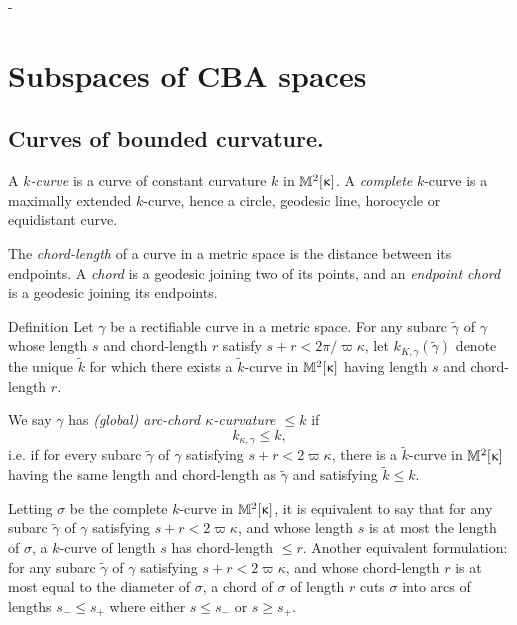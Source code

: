-%



\chapter{Subspaces of CBA spaces}

\section{Curves of bounded curvature.}\label{sec:cbc}

A {\it $k$-curve}  is a curve of constant
curvature $k$ in $\mathbb{M}_{{}}^{2}[{\upkappa}]$.  A {\it complete} $k$-curve is a maximally extended $k$-curve, hence a circle, geodesic
line, horocycle or equidistant curve.  

The \emph{chord-length} of a curve in a metric space is the distance between its endpoints.  A \emph{chord} is a geodesic joining two of its points, and an \emph{endpoint chord} is a geodesic joining its endpoints.

\begin{thm}{Definition}
\label{def:arc-chord}
Let $\gamma$ be a rectifiable curve in a metric space. For any subarc $\tilde\gamma$ of $\gamma$ whose length $s$ and chord-length $r$ satisfy $s+r <
2\pi/\varpi\kappa$, let $k_{K,\gamma}( \tilde \gamma)$ denote the unique $\tilde k$
for which there exists a $ \tilde k$-curve in $\mathbb{M}_{{}}^{2}[{\upkappa}]$ having length $s$ and
chord-length $r$. 
 
 We say $\gamma$ has \emph{(global) arc-chord $\kappa$-curvature $\le k$} if 
 $$k_{\kappa,\gamma} \le k,$$
i.e. if for every
subarc $\tilde\gamma$ of $\gamma$ satisfying $s+r < 2\varpi\kappa$, there is a
$ \tilde k$-curve in $\mathbb{M}_{{}}^{2}[{\upkappa}]$  having the same length and chord-length as $ \tilde \gamma$ and satisfying $ \tilde k \le
k$. 
\end{thm}

Letting  $\sigma$ be the complete $k$-curve in  $\mathbb{M}_{{}}^{2}[{\upkappa}]$, it is equivalent to say that for any subarc $ \tilde \gamma$ of $\gamma$  satisfying $s+r < 2\varpi\kappa$,  and whose length $s$ is at most the length of  $\sigma$, a $k$-curve of length $s$ has chord-length $\le r$.  Another equivalent formulation:  for any subarc $ \tilde \gamma$ of $\gamma$ satisfying $s+r < 2\varpi\kappa$,  and whose chord-length $r$ is  at most equal to the diameter of $\sigma$, a chord of  $\sigma$ of length $r$ cuts $\sigma$ into arcs of lengths $s_-\le s_+$ where either $s\le s_-$ or $s\ge s_+$. 

